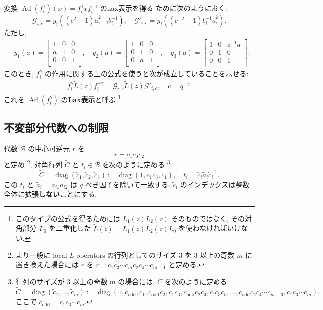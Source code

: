 \documentclass[12pt,twoside,dvipdfm]{msjproc}
\theoremstyle{definition} %
\theoremstyle{definition} %
\theoremstyle{definition} %
\numberwithin{theorem}{section}
\numberwithin{equation}{section}
\numberwithin{figure}{section}
\numberwithin{table}{section}
\newcommand\B{\mathcal{B}}
\newcommand\diag{\mathop{\mathrm{diag}}\nolimits}
\newcommand\tL{{\widetilde{L}}}
\newcommand\cG{{\mathcal{G}}}
\newcommand\Ad{\mathop{\mathrm{Ad}}\nolimits}
\newcommand\tC{{\widetilde{C}}}
\newcommand\ta{{\tilde{a}}}
\newcommand\tc{{\tilde{c}}}
\newcommand\co{c_{\mathrm{odd}}}
\begin{document}
変換 $\Ad(f_i^\gamma)(x)=f_i^\gamma x f_i^{-\gamma}$ のLax表示を得る
ために次のようにおく:
\begin{equation*}
 \cG_{i,c}  = y_i((c^{ 2}-1)\ta_{i+1}^2 b_i^{-1}), \quad
 \cG'_{i,c} = y_i((c^{-2}-1)b_i^{-1}\ta_i^2).
\end{equation*} 
ただし,
\begin{align*}
 &
 y_1(a) =
 \begin{bmatrix}
   1 & 0 & 0 \\
   a & 1 & 0 \\
   0 & 0 & 1 \\
 \end{bmatrix},
 \quad
 y_2(a) =
 \begin{bmatrix}
   1 & 0 & 0 \\
   0 & 1 & 0 \\
   0 & a & 1 \\
 \end{bmatrix},
 \quad
 y_3(a) =
 \begin{bmatrix}
   1 & 0 & z^{-1}a \\
   0 & 1 & 0 \\
   0 & 0 & 1 \\
 \end{bmatrix}.
\end{align*}
このとき, $f_i^\gamma$ の作用に関する上の公式を使うと次が成立していることを示せる:
\begin{align*}
  f_i^\gamma \tL(z) f_i^{-\gamma} = \cG_{i,c} \tL(z) \cG'_{i,c}, \quad
  c = q^{-\gamma}.
\end{align*}
これを $\Ad(f_i^\gamma)$ の{\bf Lax表示}と呼ぶ%
\footnote{このタイプの公式を得るためには $L_1(z)L_2(z)$ そのものではなく, 
その対角部分 $L_0$ を二重化した $\tL(z)=L_1(z)L_2(z)L_0$ を使わなければいけない.}.




\subsection{不変部分代数への制限}
\label{sec:fhat}

代数 $\B$ の中心可逆元 $r$ を
\begin{equation*}
 r = c_1 c_3 c_2
\end{equation*}
と定め%
\footnote{より一般に local $L$-operators の行列としてのサイズ $3$ 
を $3$ 以上の奇数 $m$ に置き換えた場合には $r$ を \(
 r = c_1 c_3 \cdots c_m c_2 c_4 \cdots c_{m-1}
\) と定める.}, %
対角行列 $\tC$ と $t_i\in\B$ を次のように定める%
\footnote{行列のサイズが $3$ 以上の奇数 $m$ の場合には,
$\tC$ を次のように定める: 
\[
 \tC=\diag(\tc_1,\ldots,\tc_m)
 := \diag
  (1, 
   \co,                      c_1, 
   \co c_2,                  c_1c_3, 
   \co c_2c_4,               c_1c_3c_5, 
   \ldots, 
   \co c_2c_4\cdots c_{m-3}, c_1c_3\cdots c_m).
\]
ここで $\co=c_1c_3\cdots c_m$.}:
\begin{equation*}
 \tC = \diag(\tc_1,\tc_2,\tc_3) := \diag(1, c_1 c_3, c_1), \quad
 t_i = \tc_i \ta_i \tc_i^{-1}.
\end{equation*}
この $t_i$ と $\ta_i=a_{i1}a_{i2}$ は $q$ べき因子を除いて一致する.
$\tc_i$ のインデックスは整数全体に拡張{\bf しない}ことにする.
\end{document}
